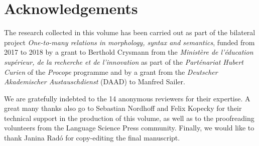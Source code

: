 \documentclass[output=paper]{langscibook}
\begin{document}
\section*{Acknowledgements}

The research collected in this volume has been carried out as
part of the bilateral project \textit{One-to-many relations in
  morphology, syntax and semantics}, funded from 2017 to 2018 by a
grant to Berthold Crysmann from the \textit{Ministère de l'éducation
  supérieur, de la recherche et de l'innovation} as part of the
\textit{Parténariat Hubert Curien} of the \textit{Procope} programme
and by a grant from the \textit{Deutscher Akademischer
  Austauschdienst} (DAAD) to Manfred Sailer.

We are gratefully indebted to the 14 anonymous reviewers for their
expertise. A great many thanks also go to Sebastian Nordhoff and Felix
Kopecky for their
technical support in the production of this volume, as well as to the
proofreading volunteers from the Language Science Press
community. Finally, we would like to thank Janina Radó for
copy-editing the final manuscript.

{\sloppy\printbibliography[heading=subbibliography,notkeyword=this]}
\end{document}
